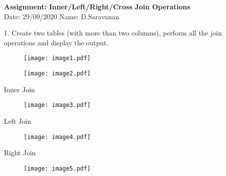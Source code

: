 \documentclass[a4paper,11pt,openright]{report}
\begin{document}
\singlespacing
\pagestyle{plain}

\begin{small}
\begin{center}
\textbf{Assignment: Inner/Left/Right/Cross Join Operations} \\
Date: 29/09/2020 \hspace{2mm} Name: D.Saravanan
\end{center}
\end{small}

\vspace{10px}

\begin{footnotesize}
1. Create two tables (with more than two columns), perform all the join operations
and display the output.
\end{footnotesize}

\begin{figure}[ht!]
\texttt{[image: image1.pdf]}
\centering
\end{figure}

\vspace{20px}

\begin{figure}[ht!]
\texttt{[image: image2.pdf]}
\centering
\end{figure}

\pagebreak

\vspace{10px}

{\footnotesize Inner Join}

\begin{figure}[ht!]
\texttt{[image: image3.pdf]}
\centering
\end{figure}

\vspace{20px}

{\footnotesize Left Join}

\begin{figure}[ht!]
\texttt{[image: image4.pdf]}
\centering
\end{figure}

\pagebreak

\vspace{20px}

{\footnotesize Right Join}

\begin{figure}[ht!]
\texttt{[image: image5.pdf]}
\centering
\end{figure}
\end{document}
